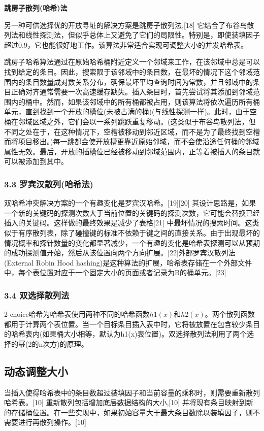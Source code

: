 \textbf{跳房子散列(哈希)法}

另一种可供选择优的开放寻址的解决方案是跳房子散列法,[18] 它结合了布谷鸟散列法和线性探测法，但似乎总体上又避免了它们的局限性。特别是，即使装填因子超过0.9，它也能很好地工作。该算法非常适合实现可调整大小的并发哈希表。

跳房子哈希算法通过在原始哈希桶附近定义一个邻域来工作，在该邻域中总是可以找到给定的条目。因此，搜索限于该邻域中的条目数，在最坏的情况下这个邻域范围内的条目数量成对数关系分布，确保最坏平均查询时间为常数，并且邻域中的条目正确对齐通常需要一次高速缓存缺失。插入条目时，首先尝试将其添加到邻域范围内的桶中。然而，如果该邻域中的所有桶都被占用，则该算法将依次遍历所有桶单元，直到找到一个开放的槽位(未被占满的桶)(与线性探测一样)。此时，由于空桶在邻域区域之外，它们会以一系列跳跃重复移动。(这类似于布谷鸟散列法，但不同之处在于，在这种情况下，空槽被移动到邻近区域，而不是为了最终找到空槽而将项目移出。)每一跳都会使开放槽更靠近原始邻域，而不会使沿途任何桶的邻域属性无效。最后，开放的插槽位已经被移动到邻域范围内，正等着被插入的条目就可以被添加到其中。

\subsubsection{3.3 罗宾汉散列(哈希法)}
双哈希冲突解决方案的一个有趣变化是罗宾汉哈希。[19][20] 其设计思路是，如果一个新的关键码的探测次数大于当前位置的关键码的探测次数，它可能会替换已经插入的关键码。这样做的最终效果是减少了表格[21] 中最坏情况的搜索时间。这类似于有序散列表，除了碰撞键的标准不依赖于键之间的直接关系。由于出现最坏的情况概率和探针数量的变化都显著减少，一个有趣的变化是哈希表探测可以从预期的成功探测值开始，然后从该位置向两个方向扩展。[22]外部罗宾汉散列法(External Robin Hood hashing)是这种算法的扩展，哈希表存储在一个外部文件中，每个表位置对应于一个固定大小的页面或者记录为B的桶单元。[23]

\subsubsection{3.4 双选择散列法}
2-choice哈希为哈希表使用两种不同的哈希函数$h1(x)$和$h2(x)$。两个散列函数都用于计算两个表位置。当一个目标条目插入表中时，它将被放置在包含较少条目的哈希表内(如果桶大小相等，默认为h1(x)表位置)。双选择散列法利用了两个选择的幂(2的n次方)的原理。

\subsection{动态调整大小}
当插入使得哈希表中的条目数超过装填因子和当前容量的乘积时，则需要重新散列哈希表。[10] 重新散列包括增加底层数据结构的大小,[10] 并将现有条目映射到新的存储桶位置。在一些实现中，如果初始容量大于最大条目数除以装填因子，则不需要进行再散列操作。[10]

